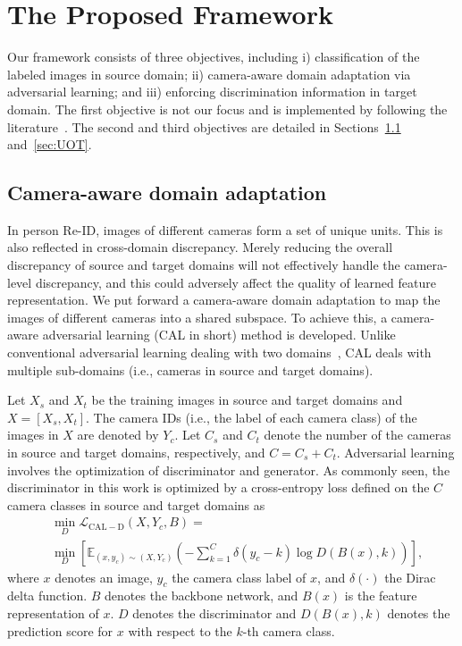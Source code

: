 \documentclass[10pt,twocolumn,letterpaper]{article}
\begin{document}
\section{The Proposed Framework}
 
Our framework consists of three objectives, including i) classification of the labeled images in source domain; ii) camera-aware domain adaptation via adversarial learning; and iii) enforcing discrimination information in target domain. The first objective is not our focus and is implemented by following the literature~\cite{DBLP:conf/cvpr/TzengHSD17,DBLP:conf/icml/LongC0J15}. The second and third objectives are detailed in Sections~\ref{sec:CAL} and~\ref{sec:UOT}. 







\subsection{Camera-aware domain adaptation}\label{sec:CAL}
 
In person Re-ID, images of different cameras form a set of unique units. This is also reflected in cross-domain discrepancy. 
Merely reducing the overall discrepancy of source and target domains will not effectively handle the camera-level discrepancy, and this could adversely affect the quality of learned feature representation. We put forward a camera-aware domain adaptation to map the images of different cameras into a shared subspace. To achieve this, a camera-aware adversarial learning (CAL in short) method is developed. Unlike conventional adversarial learning dealing with two domains~\cite{DBLP:conf/icml/GaninL15}, CAL deals with multiple sub-domains (i.e., cameras in source and target domains). 
 
Let $X_{s}$ and $X_{t}$ be the training images in source and target domains and $X=[X_{s}, X_{t}]$. The camera IDs (i.e., the label of each camera class) of the images in $X$ are denoted by $Y_{c}$. Let $C_{s}$ and $C_{t}$ denote the number of the cameras in source and target domains, respectively, and $C = C_s + C_t$. Adversarial learning involves the optimization of discriminator and generator. As commonly seen, the discriminator in this work is optimized by a cross-entropy loss defined on the $C$ camera classes in source and target domains as
\begin{equation}\label{eq11}
\begin{aligned}
&\min_{D}\mathcal{L}_\mathrm{CAL-D}(X, Y_{c}, B)= \\
&\min_{D}\left[\mathbb{E}_{(x,y_{c})\sim (X,Y_{c})}\left(-\sum_{k=1}^{C}\delta(y_{c}-k)\log D(B(x), k)\right)\right],
 \end{aligned}
\end{equation} where $x$ denotes an image, $y_{c}$ the camera class label of $x$, and $\delta(\cdot)$ the Dirac delta function. $B$ denotes the backbone network, and $B(x)$ is the feature representation of $x$. $D$ denotes the discriminator and $D(B(x), k)$ denotes the prediction score for $x$ with respect to the $k$-th camera class.
 
\end{document}
